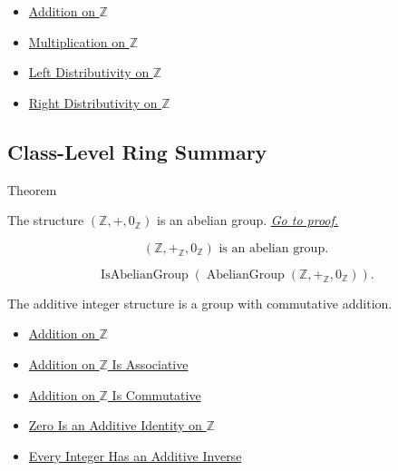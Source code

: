\begin{dependencies}
\begin{itemize}
  \item \hyperref[def:addition-on-z-classes]{Addition on $\mathbb{Z}$}
  \item \hyperref[def:multiplication-on-z-classes]{Multiplication on $\mathbb{Z}$}
  \item \hyperref[thm:left-distributivity-on-z]{Left Distributivity on $\mathbb{Z}$}
  \item \hyperref[cor:right-distributivity-on-z]{Right Distributivity on $\mathbb{Z}$}
\end{itemize}
\end{dependencies}

\subsection*{Class-Level Ring Summary}

\begin{theorembox}{Theorem}
\begin{theorem}
\label{thm:z-additive-abelian-group}
The structure $(\mathbb{Z},+,0_{\mathbb{Z}})$ is an abelian group.
\hyperref[prf:z-additive-abelian-group]{\textit{Go to proof.}}
\end{theorem}
\end{theorembox}

\begin{remark*}
\[
(\mathbb{Z},+_{\mathbb{Z}},0_{\mathbb{Z}})
\text{ is an abelian group.}
\]
\end{remark*}

\begin{remark*}
\[
\operatorname{IsAbelianGroup}(
\operatorname{AbelianGroup}(\mathbb{Z},+_{\mathbb{Z}},0_{\mathbb{Z}})).
\]
\end{remark*}

\begin{remark*}[Interpretation]
The additive integer structure is a group with commutative addition.
\end{remark*}

\begin{dependencies}
\begin{itemize}
\item \hyperref[def:addition-on-z-classes]{Addition on $\mathbb{Z}$}
  \item \hyperref[thm:addition-on-z-associative]{Addition on $\mathbb{Z}$ Is Associative}
  \item \hyperref[thm:addition-on-z-commutative]{Addition on $\mathbb{Z}$ Is Commutative}
  \item \hyperref[thm:zero-additive-identity-on-z]{Zero Is an Additive Identity on $\mathbb{Z}$}
  \item \hyperref[thm:every-integer-has-additive-inverse]{Every Integer Has an Additive Inverse}
\end{itemize}
\end{dependencies}

